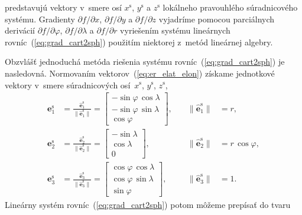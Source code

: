 \documentclass[a4paper,12pt]{book}
\let\vec\mathbf
\begin{document}
%
predstavujú vektory v~smere osí $x^{\mathrm{s}}$, $y^{\mathrm{s}}$ 
a $z^{\mathrm{s}}$ lokálneho pravouhlého súradnicového systému.  Gradienty 
$\partial f \slash \partial x$, $\partial f \slash \partial y$ a $\partial 
f \slash \partial z$ vyjadríme pomocou parciálnych derivácií $\partial f \slash 
\partial \varphi$, $\partial f \slash \partial \lambda$ a $\partial f \slash 
\partial r$ vyriešením systému lineárnych rovníc~(\ref{eq:grad_cart2sph}) 
použitím niektorej z~metód lineárnej algebry.

Obzvlášť jednoduchá metóda riešenia systému rovníc~(\ref{eq:grad_cart2sph}) je 
nasledovná.  Normovaním vektorov~(\ref{eq:er_elat_elon}) získame jednotkové 
vektory v~smere súradnicových osí~$x^\mathrm{s}$, $y^\mathrm{s}$, 
$z^\mathrm{s}$,
%
\begin{equation}
\label{eq:er_elat_elon_unit}
\begin{aligned}
%
\vec e^\mathrm{s}_1 &= \frac{\hat{\vec e}_1^\mathrm{s}}{\| \hat{\vec 
e}_1^\mathrm{s} \|} = 
%
\begin{bmatrix}
-\sin\varphi \, \cos\lambda\\
-\sin\varphi \, \sin\lambda\\
\cos\varphi
\end{bmatrix}
%
{,} \quad &\| \hat{\vec e}_1^\mathrm{s} \| &= r{,}\\
%
\vec e^\mathrm{s}_2 &= \frac{\hat{\vec e}_2^\mathrm{s}}{\| \hat{\vec 
e}_2^\mathrm{s} \|} = 
%
\begin{bmatrix}
-\sin\lambda\\
\cos\lambda\\
0
\end{bmatrix}
%
{,}  \quad &\| \hat{\vec e}_2^\mathrm{s} \| &= r \, \cos\varphi{,}\\
%
\vec e^\mathrm{s}_3 &= \frac{\hat{\vec e}_3^\mathrm{s}}{\| \hat{\vec 
e}_3^\mathrm{s} \|} = 
%
\begin{bmatrix}
\cos\varphi \, \cos\lambda\\
\cos\varphi \, \sin\lambda\\
\sin\varphi
\end{bmatrix}
%
{,} \quad &\| \hat{\vec e}_3^\mathrm{s} \| &= 1{.}
%
\end{aligned}
\end{equation}
%
Lineárny systém rovníc~(\ref{eq:grad_cart2sph}) potom môžeme prepísať do tvaru
%
\end{document}
